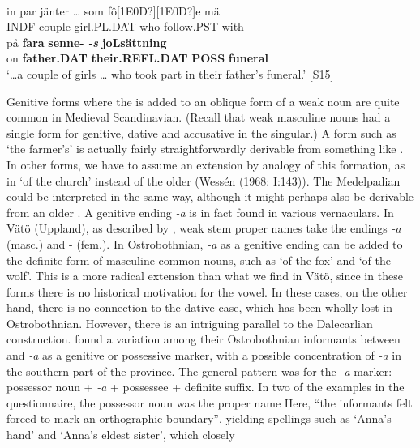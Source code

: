 \ea\label{}
\\
\gll in  par  jänter  …  som  fô[1E0D?][1E0D?]e  mä\\
INDF  couple  girl.PL.DAT    who  follow.PST  with\\
\gll på  \textbf{fara} \textbf{senne-}\textbf{\textit{  }}\textbf{\textit{\nobreakdash-s}} \textbf{joLsättning} \\
on  \textbf{father.DAT} \textbf{their.REFL.DAT} \textbf{POSS} \textbf{funeral} \\
\glt ‘…a couple of girls … who took part in their father’s funeral.’ [S15]
\z

Genitive forms where the is added to an oblique form of a weak noun are quite common in Medieval Scandinavian. (Recall that weak masculine nouns had a single form for genitive, dative and accusative in the singular.) A form such as  ‘the farmer’s’ is actually fairly straightforwardly derivable from something like . In other forms, we have to assume an extension by analogy of this formation, as in  ‘of the church’ instead of the older  (Wessén (1968: I:143)). The Medelpadian  could be interpreted in the same way, although it might perhaps also be derivable from an older . A genitive ending\textit{ {}-a} is in fact found in various vernaculars. In Vätö (Uppland), as described by \citet{Schagerström1882}, weak stem proper names take the endings\textit{ {}-a} (masc.) and \nobreakdash- (fem.). In Ostrobothnian,\textit{ {}-a} as a genitive ending can be added to the definite form of masculine common nouns, such as  ‘of the fox’ and  ‘of the wolf’. This is a more radical extension than what we find in Vätö, since in these forms there is no historical motivation for the  vowel. In these cases, on the other hand, there is no connection to the dative case, which has been wholly lost in Ostrobothnian. However, there is an intriguing parallel to the Dalecarlian construction. \citet[43]{ErikssonEtAl1999} found a variation among their Ostrobothnian informants between and\textit{ {}-a} as a genitive or possessive marker, with a possible concentration of\textit{ {}-a} in the southern part of the province. The general pattern was for the\textit{ {}-a} marker: possessor noun +\textit{ {}-a} + possessee + definite suffix. In two of the examples in the questionnaire, the possessor noun was the proper name Here, “the informants felt forced to mark an orthographic boundary”, yielding spellings such as  ‘Anna’s hand’ and ‘Anna’s eldest sister’, which closely 